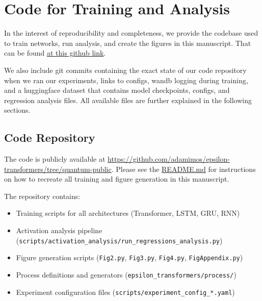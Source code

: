 \documentclass[prx,nofootinbib,onecolumn,showkeys,groupaddress,preprintnumbers,floatfix,
superscriptaddress]{revtex4-1}
\begin{document}




\section{Code for Training and Analysis}
\label{app:code}

In the interest of reproducibility and completeness, we provide the codebase used to train networks, run analysis, and create the figures in this manuscript. That can be found \href{https://github.com/adamimos/epsilon-transformers/tree/quantum-public}{at this github link}.

We also include git commits containing the exact state of our code repository when we ran our experiments, links to configs, wandb logging during training, and a huggingface dataset that contains model checkpoints, configs, and regression analysis files. All available files are further explained in the following sections.

\subsection{Code Repository}

The code is publicly available at \href{https://github.com/adamimos/epsilon-transformers/tree/quantum-public}{https://github.com/adamimos/epsilon-transformers/tree/quantum-public}.  Please see the \href{https://github.com/adamimos/epsilon-transformers/blob/quantum-public/README.md}{README.md} for instructions on how to recreate all training and figure generation in this manuscript.

The repository contains:
\begin{itemize}
    \item Training scripts for all architectures (Transformer, LSTM, GRU, RNN)
    \item Activation analysis pipeline (\texttt{scripts/activation\_analysis/run\_regressions\_analysis.py})
    \item Figure generation scripts (\texttt{Fig2.py}, \texttt{Fig3.py}, \texttt{Fig4.py}, \texttt{FigAppendix.py})
    \item Process definitions and generators (\texttt{epsilon\_transformers/process/})
    \item Experiment configuration files (\texttt{scripts/experiment\_config\_*.yaml})
\end{itemize}
\end{document}
